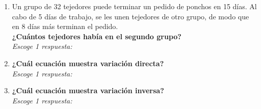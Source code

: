 \documentclass[11pt]{book}
\begin{document}
\begin{enumerate}
  \item Un grupo de 32 tejedores puede terminar un pedido de ponchos en 15 días. Al cabo de 5 días de trabajo, se les unen tejedores de otro grupo, de modo que en 8 días más terminan el pedido.\\
        \textbf{¿Cuántos tejedores había en el segundo grupo?}\\
        \emph{Escoge 1 respuesta:}\\

  \item \textbf{¿Cuál ecuación muestra variación directa?}\\
        \emph{Escoge 1 respuesta:}\\

  \item \textbf{¿Cuál ecuación muestra variación inversa?}\\
        \emph{Escoge 1 respuesta:}\\


\end{enumerate}
\end{document}
